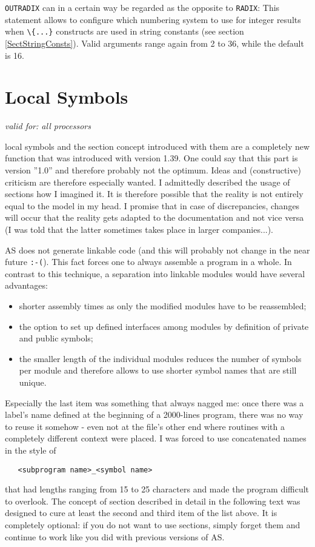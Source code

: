 \documentclass[12pt,twoside]{report}
\newcommand{\tty}[1]{{\tt #1}}
\newcommand{\asname}{{AS}}
\begin{document}
\tty{OUTRADIX} can in a certain way be regarded as the opposite to
\tty{RADIX}: This statement allows to configure which numbering system to
use for integer results when \verb!\{...}! constructs are used in string
constants (see section \ref{SectStringConsts}).  Valid arguments range
again from 2 to 36, while the default is 16.


\section{Local Symbols}
\label{ChapLocSyms}

{\em valid for: all processors}

local symbols and the section concept introduced with them are a
completely new function that was introduced with version 1.39.  One
could say that this part is version ''1.0'' and therefore probably not
the optimum.  Ideas and (constructive) criticism are therefore
especially wanted.  I admittedly described the usage of sections how
I imagined it.  It is therefore possible that the reality is not
entirely equal to the model in my head.  I promise that in case of
discrepancies, changes will occur that the reality gets adapted to
the documentation and not vice versa (I was told that the latter
sometimes takes place in larger companies...).

\asname{} does not generate linkable code (and this will probably not change
in the near future \tty{:-(}).  This fact forces one to always assemble a
program in a whole.  In contrast to this technique, a separation into
linkable modules would have several advantages:
\begin{itemize}
\item{shorter assembly times as only the modified modules have to be
      reassembled;}
\item{the option to set up defined interfaces among modules by definition
      of private and public symbols;}
\item{the smaller length of the individual modules reduces the number of
      symbols per module and therefore allows to use shorter symbol names
      that are still unique.}
\end{itemize}
Especially the last item was something that always nagged me: once
there was a label's name defined at the beginning of a 2000-lines
program, there was no way to reuse it somehow - even not at the
file's other end where routines with a completely different context
were placed.  I was forced to use concatenated names in the style of
\begin{verbatim}
   <subprogram name>_<symbol name>
\end{verbatim}
that had lengths ranging from 15 to 25 characters and made the
program difficult to overlook.  The concept of section described in
detail in the following text was designed to cure at least the second
and third item of the list above.  It is completely optional: if you
do not want to use sections, simply forget them and continue to work
like you did with previous versions of \asname{}.
\end{document}
